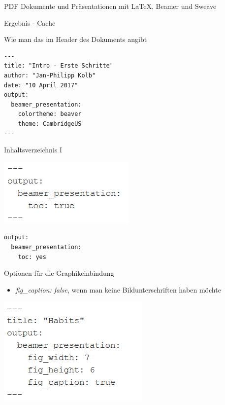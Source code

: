 \documentclass[ignorenonframetext,]{beamer}
\providecommand{\tightlist}{%
\setlength{\itemsep}{0pt}\setlength{\parskip}{0pt}}
\begin{document}
\begin{frame}[fragile]{PDF Dokumente und Präsentationen mit LaTeX,
Beamer und Sweave}
\begin{block}{Ergebnis - Cache}
\end{block}

\begin{block}{Wie man das im Header des Dokuments angibt}

\begin{verbatim}
---
title: "Intro - Erste Schritte"
author: "Jan-Philipp Kolb"
date: "10 April 2017"
output:
  beamer_presentation: 
    colortheme: beaver
    theme: CambridgeUS
---
\end{verbatim}

\end{block}

\begin{block}{Inhaltsverzeichnis I}

\includegraphics{./tex2pdf.9796/c6f4f3b8a4cec040a5f0ba257de6936cf3189beb.png}

\begin{verbatim}
output: 
  beamer_presentation: 
    toc: yes
\end{verbatim}

\end{block}

\begin{block}{Optionen für die Graphikeinbindung}

\begin{itemize}
\tightlist
\item
  \emph{fig\_caption: false}, wenn man keine Bildunterschriften haben
  möchte
\end{itemize}

\includegraphics{./tex2pdf.9796/391410b708b66c2ec08aaecab08f73fa1faa805e.png}


\end{block}
\end{frame}
\end{document}
